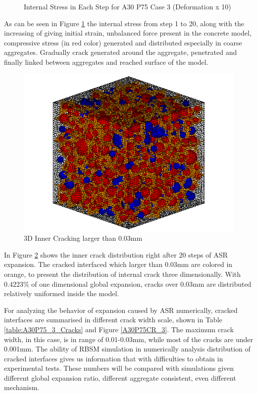 \begin{figure}[ht!]
      

  \caption{Internal Stress in Each Step for A30 P75 Case 3 (Deformation x 10)}
  \label{fig:ASR_A30P75_3_IS}
  \end{figure}

As can be seen in Figure \ref{fig:ASR_A30P75_3_IS} the internal stress from step 1 to 20, along with the increasing of giving initial strain, unbalanced force present in the concrete model, compressive stress (in red color) generated and distributed especially in coarse aggregates. Gradually crack generated around the aggregate, penetrated and finally linked between aggregates and reached surface of the model.

\begin{figure}[ht!]
\centering
\includegraphics[width=.5\linewidth]{Files/exp_3D/ASR/A30P75_3_c.png}
  \caption{3D Inner Cracking larger than 0.03mm}
  \label{fig:A30P75_3_crack}
\end{figure}

In Figure \ref{fig:A30P75_3_crack} shows the inner crack distribution right after 20 steps of ASR expansion. The cracked interfaced which larger than 0.03mm are colored in orange, to present the distribution of internal crack three dimensionally. With 0.4223\% of one dimensional global expansion, cracks over 0.03mm are distributed relatively uniformed inside the model.

For analyzing the behavior of expansion caused by ASR numerically, cracked interfaces are summarised in different crack width scale, shown in Table \ref{table:A30P75_3_Cracks} and Figure \ref{A30P75CR_3}. The maximum crack width, in this case, is in range of 0.01-0.03mm, while most of the cracks are under 0.001mm. The ability of RBSM simulation in numerically analysis distribution of cracked interfaces gives us information that with difficulties to obtain in experimental tests. These numbers will be compared with simulations given different global expansion ratio, different aggregate consistent, even different mechanism.


